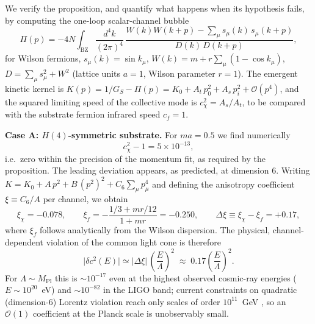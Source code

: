 \documentclass[11pt,a4paper]{article}
\begin{document}
We verify the proposition, and quantify what happens when its
hypothesis fails, by computing the one-loop scalar-channel bubble
\begin{equation}
\Pi(p) = -4N \int_{\mathrm{BZ}} \frac{d^4k}{(2\pi)^4}\,
\frac{W(k)W(k+p) - \sum_\mu s_\mu(k)\,s_\mu(k+p)}
{D(k)\,D(k+p)},
\label{eq:bubble}
\end{equation}
for Wilson fermions, $s_\mu(k) = \sin k_\mu$,
$W(k) = m + r\sum_\mu(1 - \cos k_\mu)$,
$D = \sum_\mu s_\mu^2 + W^2$ (lattice units $a = 1$, Wilson
parameter $r = 1$).
The emergent kinetic kernel is
$K(p) = 1/G_S - \Pi(p) = K_0 + A_t\,p_0^2 + A_s\,p_i^2
+ \mathcal{O}(p^4)$, and the squared limiting speed of the
collective mode is $c_\chi^2 = A_s/A_t$, to be compared with the
substrate fermion infrared speed $c_f = 1$.

\textbf{Case A: $H(4)$-symmetric substrate.}
For $ma = 0.5$ we find numerically
\begin{equation}
c_\chi^2 - 1 = 5\times 10^{-13},
\end{equation}
i.e.\ zero within the precision of the momentum fit, as required by
the proposition.
The leading deviation appears, as predicted, at dimension 6.
Writing $K = K_0 + A\,p^2 + B\,(p^2)^2 + C_6\sum_\mu p_\mu^4$ and
defining the anisotropy coefficient $\xi \equiv C_6/A$ per channel,
we obtain
\begin{equation}
\xi_\chi = -0.078, \qquad
\xi_f = -\frac{1/3 + mr/12}{1 + mr} = -0.250, \qquad
\Delta\xi \equiv \xi_\chi - \xi_f = +0.17,
\end{equation}
where $\xi_f$ follows analytically from the Wilson dispersion.
The physical, channel-dependent violation of the common light cone
is therefore
\begin{equation}
\bigl|\delta c^2(E)\bigr| \simeq |\Delta\xi|\,
\left(\frac{E}{\Lambda}\right)^2
\;\approx\; 0.17\left(\frac{E}{\Lambda}\right)^2 .
\label{eq:dc-dim6}
\end{equation}
For $\Lambda \sim M_{\mathrm{Pl}}$ this is
$\sim 10^{-17}$ even at the highest observed cosmic-ray energies
($E \sim 10^{20}$~eV) and $\sim 10^{-82}$ in the LIGO band;
current constraints on quadratic (dimension-6) Lorentz violation
reach only scales of order $10^{11}$~GeV \cite{Liberati:2013xla},
so an $\mathcal{O}(1)$ coefficient at the Planck scale is
unobservably small.
\end{document}
